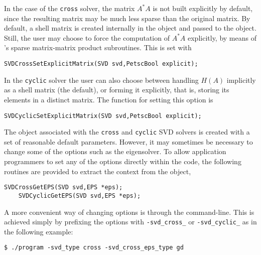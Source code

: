 In the case of the \texttt{cross} solver, the matrix $A^*A$ is not built explicitly by default, since the resulting matrix may be much less sparse than the original matrix. By default, a shell matrix is created internally in the  object and passed to the  object. Still, the user may choose to force the computation of $A^*A$ explicitly, by means of \petsc's sparse matrix-matrix product subroutines. This is set with
	\begin{Verbatim}[fontsize=\small]
	SVDCrossSetExplicitMatrix(SVD svd,PetscBool explicit);
	\end{Verbatim}
In the \texttt{cyclic} solver the user can also choose between handling $H(A)$ implicitly as a shell matrix (the default), or forming it explicitly, that is, storing its elements in a distinct matrix. The function for setting this option is
	\begin{Verbatim}[fontsize=\small]
	SVDCyclicSetExplicitMatrix(SVD svd,PetscBool explicit);
	\end{Verbatim}

The  object associated with the \texttt{cross} and \texttt{cyclic} SVD solvers is created with a set of reasonable default parameters. However, it may sometimes be necessary to change some of the  options such as the eigensolver. To allow application programmers to set any of the  options directly within the code, the following routines are provided to extract the  context from the  object,
	\begin{Verbatim}[fontsize=\small]
	SVDCrossGetEPS(SVD svd,EPS *eps);
	SVDCyclicGetEPS(SVD svd,EPS *eps);
	\end{Verbatim}
A more convenient way of changing  options is through the command-line. This is achieved simply by prefixing the  options with \texttt{-svd\_cross\_} or \texttt{-svd\_cyclic\_} as in the following example:
\begin{Verbatim}[fontsize=\small]
	$ ./program -svd_type cross -svd_cross_eps_type gd
\end{Verbatim}

